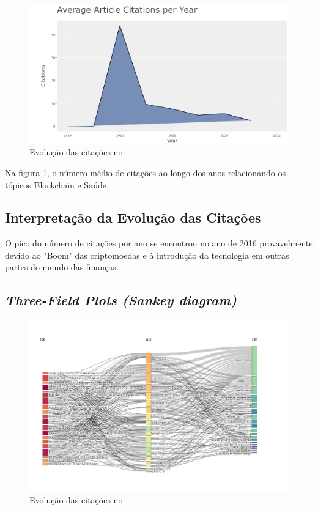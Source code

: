 \begin{figure}[H]
    \centering
    \includegraphics[width=1\textwidth]{experiments/brunoedcf/AnaliseBibliometrica/BlockchainInHealth/Figures/AvgCitationsYear.png}
    \caption{Evolução das citações no \dataset}
    \label{fig:brunoedcf/AvgCitationsYear}
\end{figure}

Na figura \ref{fig:brunoedcf/AvgCitationsYear}, o número médio de citações ao longo dos anos relacionando os tópicos Blockchain e Saúde.

\subsection{Interpretação da Evolução das Citações}

O pico do número de citações por ano se encontrou no ano de 2016 provavelmente devido ao "Boom" das criptomoedas e à introdução da tecnologia em outras partes do mundo das finanças.


\subsection{\textit{Three-Field Plots (Sankey diagram)}}

\begin{figure}[H]
    \centering
    \includegraphics[width=1\textwidth]{experiments/brunoedcf/AnaliseBibliometrica/BlockchainInHealth/Figures/ThreeFieldsPlot.png}
    \caption{Evolução das citações no \dataset}
    \label{fig:brunoedcf/ThreeFieldsPlot}
\end{figure}

